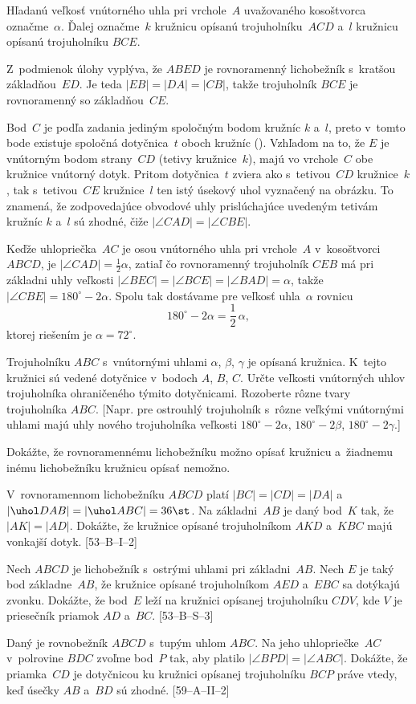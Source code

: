 {%
Hľadanú veľkosť vnútorného uhla pri vrchole~$A$
uvažovaného kosoštvorca označme~$\alpha$.
Ďalej označme~$k$ kružnicu opísanú trojuholníku~$ACD$
a~$l$ kružnicu opísanú trojuholníku $BCE$.

Z~podmienok úlohy vyplýva, že $ABED$ je rovnoramenný lichobežník
s~kratšou základňou~$ED$. Je teda $|EB|=|DA|=|CB|$, takže trojuholník
$BCE$ je rovnoramenný so základňou~$CE$.

Bod~$C$ je podľa zadania jediným spoločným bodom kružníc $k$ a~$l$,
preto v~tomto bode existuje spoločná dotyčnica~$t$ oboch kružníc (\obr).
Vzhľadom na to, že $E$ je vnútorným bodom strany~$CD$ (tetivy kružnice~$k$),
majú vo vrchole~$C$ obe kružnice vnútorný dotyk. Pritom dotyčnica~$t$
zviera ako s~tetivou~$CD$ kružnice~$k$, tak s~tetivou~$CE$ kružnice~$l$
ten istý úsekový uhol vyznačený na obrázku. To znamená, že zodpovedajúce obvodové
uhly prislúchajúce uvedeným tetivám kružníc $k$ a~$l$ sú zhodné, čiže
$|\angle CAD|=|\angle CBE|$.
%

Keďže uhlopriečka~$AC$ je osou vnútorného uhla pri vrchole~$A$
v~kosoštvorci $ABCD$, je $|\angle CAD|=\frac{1}{2}\alpha$, zatiaľ čo
rovnoramenný trojuholník $CEB$ má pri základni uhly veľkosti
$|\angle BEC|=|\angle BCE|=|\angle BAD|=\alpha$, takže
$|\angle CBE|=180^\circ-2\alpha$.
Spolu tak dostávame pre veľkosť uhla~$\alpha$ rovnicu
$$
180^{\circ}-2\alpha=\frac12\,\alpha,
$$
ktorej riešením je $\alpha = 72^\circ$.



Trojuholníku $ABC$ s~vnútornými uhlami $\alpha$, $\beta$, $\gamma$ je
opísaná kružnica. K~tejto kružnici sú vedené dotyčnice v~bodoch $A$, $B$, $C$.
Určte veľkosti vnútorných uhlov trojuholníka ohraničeného týmito dotyčnicami.
Rozoberte rôzne tvary trojuholníka $ABC$. [Napr. pre ostrouhlý
trojuholník s~rôzne veľkými vnútornými uhlami majú uhly nového
trojuholníka veľkosti $180^\circ - 2\alpha$, $180^\circ - 2\beta$,
$180^\circ - 2\gamma$.]

Dokážte, že rovnoramennému lichobežníku možno opísať kružnicu a~žiadnemu
inému lichobežníku kružnicu opísať nemožno.

V~rovnoramennom lichobežníku $ABCD$ platí $|BC|=|CD|=|DA|$
a~$|\uhol DAB|=|\uhol ABC|=36\st$. Na základni~$AB$ je daný bod~$K$
tak, že $|AK|=|AD|$. Dokážte, že kružnice opísané trojuholníkom $AKD$
a~$KBC$ majú vonkajší dotyk.
[53--B--I--2]

Nech $ABCD$ je lichobežník s~ostrými uhlami pri základni~$AB$. Nech $E$ je
taký bod základne~$AB$, že kružnice opísané trojuholníkom $AED$ a~$EBC$ sa dotýkajú
zvonku. Dokážte, že bod~$E$ leží na kružnici opísanej trojuholníku $CDV$,
kde $V$ je priesečník priamok $AD$ a~$BC$.
[53--B--S--3]

Daný je rovnobežník $ABCD$ s~tupým uhlom $ABC$. Na jeho uhlopriečke~$AC$
v~polrovine $BDC$ zvoľme bod~$P$ tak, aby platilo $|\angle
BPD|=|\angle ABC|$. Dokážte, že priamka~$CD$ je dotyčnicou ku kružnici
opísanej trojuholníku $BCP$ práve vtedy, keď úsečky $AB$ a~$BD$ sú zhodné.
[59--A--II--2]
}

